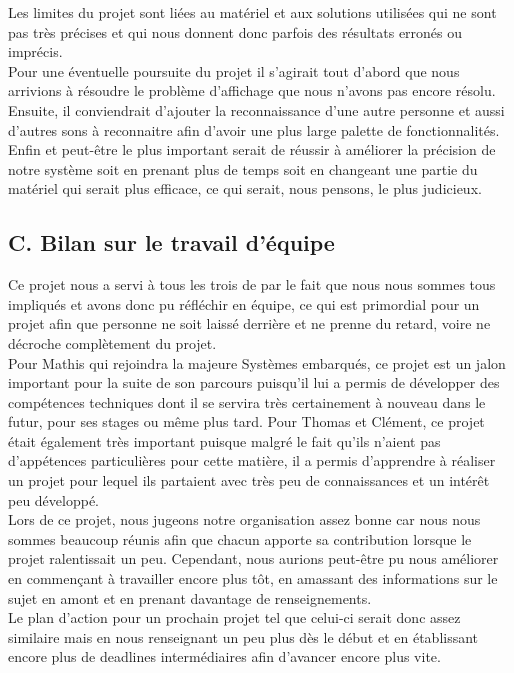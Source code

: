 \documentclass[a4paper,11pt]{book}
\begin{document}
Les limites du projet sont liées au matériel et aux solutions utilisées qui ne sont pas très précises et qui nous donnent donc parfois des résultats erronés ou imprécis.\\
Pour une éventuelle poursuite du projet il s'agirait tout d'abord que nous arrivions à résoudre le problème d'affichage que nous n'avons pas encore résolu. Ensuite, il conviendrait d'ajouter la reconnaissance d'une autre personne et aussi d'autres sons à reconnaitre afin d'avoir une plus large palette de fonctionnalités. Enfin et peut-être le plus important serait de réussir à améliorer la précision de notre système soit en prenant plus de temps soit en changeant une partie du matériel qui serait plus efficace, ce qui serait, nous pensons, le plus judicieux.

\subsection*{C. Bilan sur le travail d'équipe}

Ce projet nous a servi à tous les trois de par le fait que nous nous sommes tous impliqués et avons donc pu réfléchir en équipe, ce qui est primordial pour un projet afin que personne ne soit laissé derrière et ne prenne du retard, voire ne décroche complètement du projet.\\
Pour Mathis qui rejoindra la majeure Systèmes embarqués, ce projet est un jalon important pour la suite de son parcours puisqu'il lui a permis de développer des compétences techniques dont il se servira très certainement à nouveau dans le futur, pour ses stages ou même plus tard.  
Pour Thomas et Clément, ce projet était également très important puisque malgré le fait qu'ils n'aient pas d'appétences particulières pour cette matière, il a permis d'apprendre à réaliser un projet pour lequel ils partaient avec très peu de connaissances et un intérêt peu développé. 
\\
Lors de ce projet, nous jugeons notre organisation assez bonne car nous nous sommes beaucoup réunis afin que chacun apporte sa contribution lorsque le projet ralentissait un peu. Cependant, nous aurions peut-être pu nous améliorer en commençant à travailler encore plus tôt, en amassant des informations sur le sujet en amont et en prenant davantage de renseignements. \\ Le plan d'action pour un prochain projet tel que celui-ci serait donc assez similaire mais en nous renseignant un peu plus dès le début et en établissant encore plus de deadlines intermédiaires afin d'avancer encore plus vite.
\end{document}
